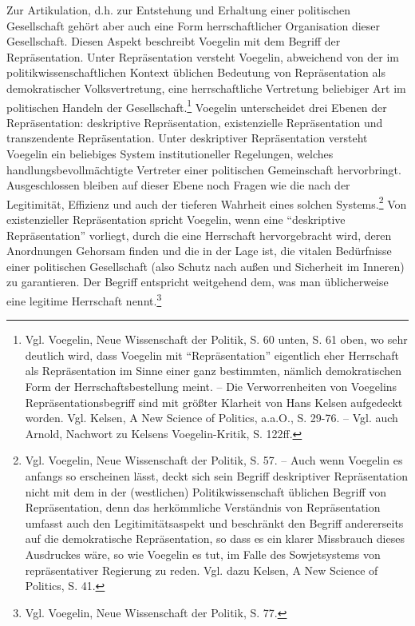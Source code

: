 Zur Artikulation, d.h. zur Entstehung und Erhaltung einer politischen
Gesellschaft gehört aber auch eine Form herrschaftlicher Organisation dieser
Gesellschaft. Diesen Aspekt beschreibt Voegelin mit dem Begriff der
Repräsentation. Unter Repräsentation versteht Voegelin, abweichend von der im
politikwissenschaftlichen Kontext üblichen Bedeutung von Repräsentation als
demokratischer Volksvertretung, eine herrschaftliche Vertretung beliebiger Art
im politischen Handeln der Gesellschaft.\footnote{Vgl.  Voegelin, Neue
  Wissenschaft der Politik, S. 60 unten, S. 61 oben, wo sehr deutlich wird,
  dass Voegelin mit "`Repräsentation"' eigentlich eher Herrschaft als
  Repräsentation im Sinne einer ganz bestimmten, nämlich demokratischen Form
  der Herrschaftsbestellung meint. -- Die Verworrenheiten von Voegelins
  Repräsentationsbegriff sind mit größter Klarheit von Hans Kelsen aufgedeckt
  worden. Vgl. Kelsen, A New Science of Politics, a.a.O., S. 29-76. -- Vgl.
  auch Arnold, Nachwort zu Kelsens Voegelin-Kritik, S. 122ff.} Voegelin
unterscheidet drei Ebenen der Repräsentation: deskriptive Repräsentation,
existenzielle Repräsentation und transzendente Repräsentation.  Unter
deskriptiver Repräsentation versteht Voegelin ein beliebiges System
institutioneller Regelungen, welches handlungsbevollmächtigte Vertreter einer
politischen Gemeinschaft hervorbringt. Ausgeschlossen bleiben auf dieser Ebene
noch Fragen wie die nach der Legitimität, Effizienz und auch der tieferen
Wahrheit eines solchen Systems.\footnote{Vgl. Voegelin, Neue Wissenschaft der
  Politik, S. 57.  -- Auch wenn Voegelin es anfangs so erscheinen lässt, deckt
  sich sein Begriff deskriptiver Repräsentation nicht mit dem in der
  (westlichen) Politikwissenschaft üblichen Begriff von Repräsentation, denn
  das herkömmliche Verständnis von Repräsentation umfasst auch den
  Legitimitätsaspekt und beschränkt den Begriff andererseits auf die
  demokratische Repräsentation, so dass es ein klarer Missbrauch dieses
  Ausdruckes wäre, so wie Voegelin es tut, im Falle des Sowjetsystems von
  repräsentativer Regierung zu reden. Vgl. dazu Kelsen, A New Science of
  Politics, S. 41.} Von existenzieller Repräsentation spricht Voegelin, wenn
eine "`deskriptive Repräsentation"' vorliegt, durch die eine Herrschaft
hervorgebracht wird, deren Anordnungen Gehorsam finden und die in der Lage
ist, die vitalen Bedürfnisse einer politischen Gesellschaft (also Schutz nach
außen und Sicherheit im Inneren) zu garantieren. Der Begriff entspricht
weitgehend dem, was man üblicherweise eine legitime Herrschaft
nennt.\footnote{Vgl. Voegelin, Neue Wissenschaft der Politik, S. 77.}

